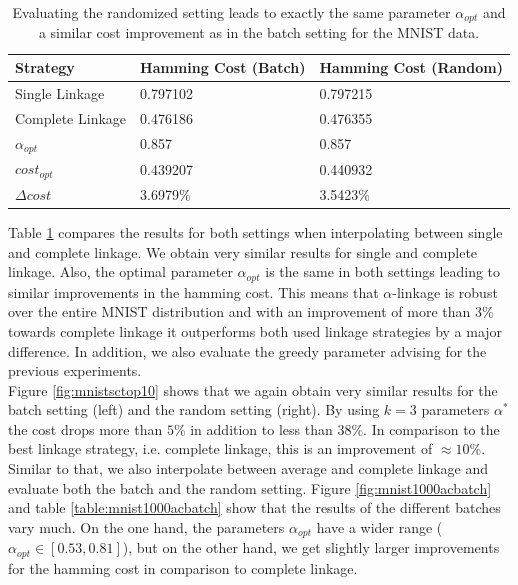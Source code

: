 \begin{table}[H]
    \centering
    \begin{tabular}{|l | l | l |}
    \hline
    Strategy & Hamming Cost (Batch) & Hamming Cost (Random)\\ \hline
    Single Linkage & 0.797102 & 0.797215\\
    Complete Linkage & 0.476186 & 0.476355\\
    $\alpha_{opt}$ & 0.857 & 0.857\\
    $cost_{opt}$ & 0.439207 & 0.440932\\
    $\Delta cost$ & 3.6979\% & 3.5423\%\\\hline
    \end{tabular}
    \caption{Evaluating the randomized setting leads to exactly the same parameter $\alpha_{opt}$ and a similar cost improvement as in the batch setting for the MNIST data.}
    \label{table:mnist1000randomsc}
\end{table}

Table \ref{table:mnist1000randomsc} compares the results for both settings when interpolating between single and complete linkage. We obtain very similar results for single and complete linkage. Also, the optimal parameter $\alpha_{opt}$ is the same in both settings leading to similar improvements in the hamming cost. This means that $\alpha$-linkage is robust over the entire MNIST distribution and with an improvement of more than $3\%$ towards complete linkage it outperforms both used linkage strategies by a major difference. In addition, we also evaluate the greedy parameter advising for the previous experiments.\\

Figure \ref{fig:mnistsctop10} shows that we again obtain very similar results for the batch setting (left) and the random setting (right). By using $k = 3$ parameters $\alpha^*$ the cost drops more than $5\%$ in addition to less than $38\%$. In comparison to the best linkage strategy, i.e. complete linkage, this is an improvement of $\approx 10\%$.\\

Similar to that, we also interpolate between average and complete linkage and evaluate both the batch and the random setting. Figure \ref{fig:mnist1000acbatch} and table \ref{table:mnist1000acbatch} show that the results of the different batches vary much. On the one hand, the parameters $\alpha_{opt}$ have a wider range ($\alpha_{opt} \in [0.53,0.81]$), but on the other hand, we get slightly larger improvements for the hamming cost in comparison to complete linkage.

